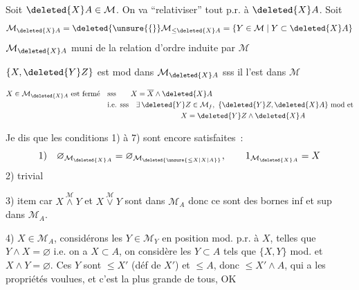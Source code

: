 Soit $\deleted{X}A\in \mathcal M$. On va ``relativiser'' tout p.r. à $\deleted{X}A$. Soit 
\[
\mathcal M_{\deleted{X}A}=\deleted{\unsure{\{}}\mathcal M_{\leq\deleted{X}A}=\{Y\in \mathcal M\mid Y\subset\deleted{X}A\}
\]
$\mathcal M_{\deleted{X}A}$ muni de la relation d'ordre induite par $\mathcal M$

$\{X,\deleted{Y}Z\}$ est mod dans $\mathcal M_{\deleted{X}A}$ sss il l'est dans $\mathcal M$

\[
\begin{aligned}
X\in \mathcal M_{\deleted{X}A}\text{ est fermé}\quad &\text{sss}\qquad X=\overline X\wedge\deleted{X}A\\
&\text{i.e. sss}\quad\exists\,\deleted{Y}Z\in \mathcal M_f,\ \{\deleted{Y}Z,\deleted{X}A\}\ \text{mod et}\\
&\hspace{10em}X=\deleted{Y}Z\wedge\deleted{X}A
\end{aligned}
\]

Je dis que les conditions 1) à 7) sont encore satisfaites~:
\[
\text{1)}\quad\varnothing_{\mathcal M_{\deleted{X}A}}=\varnothing_{\mathcal M_{\deleted{\unsure{\leq X|X|A}}}},\qquad 1_{\mathcal M_{\deleted{X}A}}=X
\]
2)  trivial

3) item car  $X\overset{\mathcal M}{\wedge}Y$ et $X\overset{\mathcal M}{\vee}Y$ sont dans $\mathcal M_A$ donc ce sont des bornes inf et sup dans $\mathcal M_A$.

4)  $X\in \mathcal M_A$, considérons les $Y\in \mathcal M_{Y}$ en position mod. p.r. à $X$, telles que $Y\wedge X=\varnothing$ i.e.  on a $X\subset A$, on considère les $Y\subset A$ tels que $\{X,Y\}$ mod. et $X\wedge Y=\varnothing$. Ces $Y$ sont $\leq X'$ (déf de $X'$) et $\leq A$, donc $\leq X'\wedge A$, qui a les propriétés voulues, et c'est la plus grande de tous, OK
